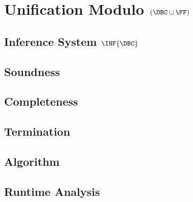 \chapter{Unification Modulo \texorpdfstring{$(\DBC \cup \FF)$}{(DBC U F)}}\label{chap:unif-dbcuh}

\section{Inference System \texorpdfstring{$\INF{\DBC}$}{IDBC}}\label{sec:inf-dbc}

\section{Soundness}\label{sec:dbc-soundness}

\section{Completeness}\label{sec:dbc-completeness}

\section{Termination}\label{sec:dbc-termination}

\section{Algorithm}\label{sec:dbc-algorithm}

\section{Runtime Analysis}\label{sec:dbc-runtime-analysis}

